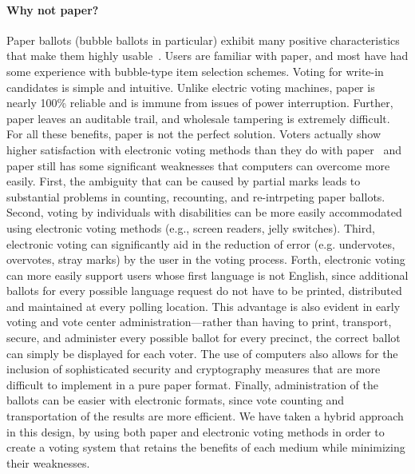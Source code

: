 \paragraph{Why not paper?}
Paper ballots (bubble ballots in particular) exhibit many positive characteristics that make them highly usable~\cite{hfes-06,byrne-baseline}. Users are familiar with paper, and most have had some experience with bubble-type item selection schemes. Voting for write-in candidates is simple and intuitive. Unlike electric voting machines, paper is nearly 100\% reliable and is immune from issues of power interruption. Further, paper leaves an auditable trail, and wholesale tampering is extremely difficult. 
For all these benefits, paper is not the perfect solution. Voters actually show higher satisfaction with electronic voting methods than they do with paper~\cite{everett08chi-dre-usability} and paper still has some significant weaknesses that computers can overcome more easily. 
First, the ambiguity that can be caused by partial marks leads to substantial problems in counting, recounting, and re-intrpeting paper ballots.
Second, voting by individuals with disabilities can be more easily accommodated using electronic voting methods (e.g., screen readers, jelly switches).
Third, electronic voting can significantly aid in the reduction of error (e.g. undervotes, overvotes, stray marks) by the user in the voting process.
Forth, electronic voting can more easily support users whose first language is not English, since additional ballots for every possible language request do not have to be printed, distributed and maintained at every polling location. This advantage is also evident in early voting and vote center administration---rather than having to print, transport, secure, and administer every possible ballot for every precinct, the correct ballot can simply be displayed for each voter. The use of computers also allows for the inclusion of sophisticated security and cryptography measures that are more difficult to implement in a pure paper format.
Finally, administration of the ballots can be easier with electronic formats, since vote counting and transportation of the results are more efficient.
We have taken a hybrid approach in this design, by using both paper and electronic voting methods in order to create a voting system that retains the benefits of each medium while minimizing their weaknesses. 
